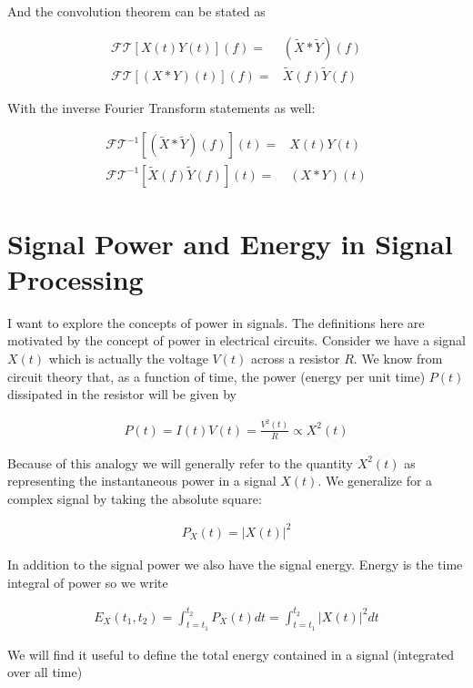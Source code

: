 \documentclass[12pt]{article}
\begin{document}
And the convolution theorem can be stated as

\begin{align}
\mathcal{FT}\left[X(t)Y(t)\right](f) =& \left(\tilde{X} \ast \tilde{Y}\right)(f)\\
\mathcal{FT}\left[(X\ast Y)(t)\right](f) =& \tilde{X}(f)\tilde{Y}(f)
\end{align}

With the inverse Fourier Transform statements as well:

\begin{align}
\mathcal{FT}^{-1}\left[(\tilde{X}\ast\tilde{Y})(f)\right](t) =& X(t)Y(t)\\
\mathcal{FT}^{-1}\left[\tilde{X}(f)\tilde{Y}(f)\right](t) =& (X\ast Y)(t)
\end{align}

\section{Signal Power and Energy in Signal Processing}

I want to explore the concepts of power in signals. 
The definitions here are motivated by the concept of power in electrical circuits.
Consider we have a signal $X(t)$ which is actually the voltage $V(t)$ across a resistor $R$.
We know from circuit theory that, as a function of time, the power (energy per unit time) $P(t)$ dissipated in the resistor will be given by

\begin{align}
P(t) = I(t)V(t) = \frac{V^2(t)}{R} \propto X^2(t)
\end{align}

Because of this analogy we will generally refer to the quantity $X^2(t)$ as representing the instantaneous power in a signal $X(t)$. 
We generalize for a complex signal by taking the absolute square:

\begin{align}
P_X(t) = |X(t)|^2
\end{align}

In addition to the signal power we also have the signal energy.
Energy is the time integral of power so we write

\begin{align}
E_X(t_1, t_2) = \int_{t=t_1}^{t_2} P_X(t) dt = \int_{t=t_1}^{t_2} |X(t)|^2 dt
\end{align}

We will find it useful to define the total energy contained in a signal (integrated over all time)
\end{document}
